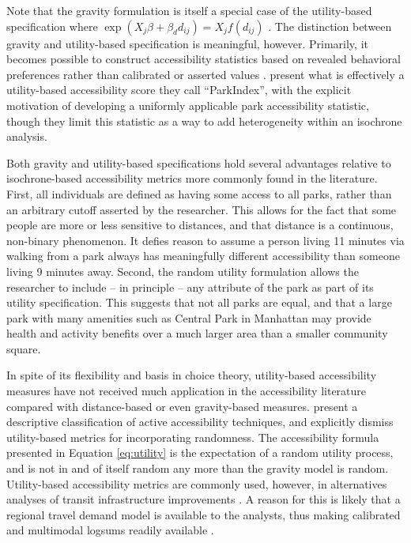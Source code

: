 \documentclass[Afour,sageh.bst]{sagej}
\begin{document}
Note that the gravity formulation is itself a special case of the
utility-based specification where
\(\exp(X_j\beta + \beta_d d_{ij}) = X_j f(d_{ij})\) \citep{Daly1982}.
The distinction between gravity and utility-based specification is
meaningful, however. Primarily, it becomes possible to construct
accessibility statistics based on revealed behavioral preferences rather
than calibrated or asserted values \citep{Handy1997}.
\citet{Kaczynski2016} present what is effectively a utility-based
accessibility score they call ``ParkIndex'', with the explicit
motivation of developing a uniformly applicable park accessibility
statistic, though they limit this statistic as a way to add
heterogeneity within an isochrone analysis.

Both gravity and utility-based specifications hold several advantages
relative to isochrone-based accessibility metrics more commonly found in
the literature. First, all individuals are defined as having some access
to all parks, rather than an arbitrary cutoff asserted by the
researcher. This allows for the fact that some people are more or less
sensitive to distances, and that distance is a continuous, non-binary
phenomenon. It defies reason to assume a person living 11 minutes via
walking from a park always has meaningfully different accessibility than
someone living 9 minutes away. Second, the random utility formulation
allows the researcher to include -- in principle -- any attribute of the
park as part of its utility specification. This suggests that not all
parks are equal, and that a large park with many amenities such as
Central Park in Manhattan may provide health and activity benefits over
a much larger area than a smaller community square.

In spite of its flexibility and basis in choice theory, utility-based
accessibility measures have not received much application in the
accessibility literature compared with distance-based or even
gravity-based measures. \citet{Vale2016} present a descriptive
classification of active accessibility techniques, and explicitly
dismiss utility-based metrics for incorporating randomness. The
accessibility formula presented in Equation \ref{eq:utility} is the
expectation of a random utility process, and is not in and of itself
random any more than the gravity model is random. Utility-based
accessibility metrics are commonly used, however, in alternatives
analyses of transit infrastructure improvements \citep{DeJong2007}. A
reason for this is likely that a regional travel demand model is
available to the analysts, thus making calibrated and multimodal logsums
readily available \citep{Geurs2010}.
\end{document}
